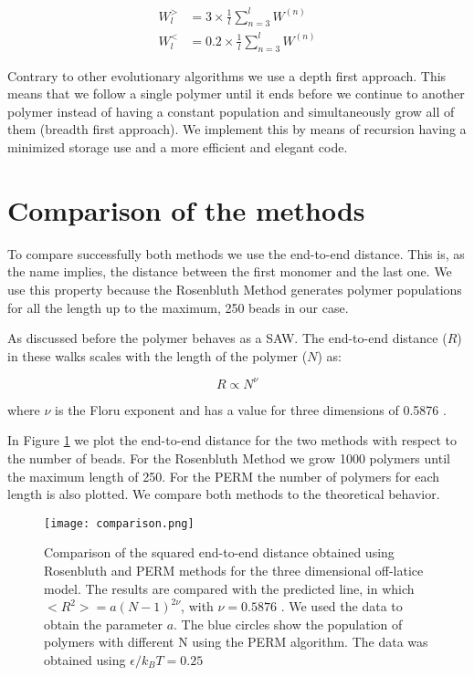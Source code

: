 \documentclass[aps,prl,reprint,groupedaddress]{revtex4-1}
\begin{document}
\begin{equation}
\begin{split}
	W_l^> &= 3 \times \frac{1}{l}\sum_{n=3}^l W^{(n)} \\
    W_l^< &= 0.2 \times \frac{1}{l}\sum_{n=3}^l W^{(n)}
\end{split}
\end{equation}

Contrary to other evolutionary algorithms we use a depth first approach. This means that we follow a single polymer until it ends before we continue to another polymer instead of having a constant population and simultaneously grow all of them (breadth first approach). We implement this by means of recursion having a minimized storage use and a more efficient and elegant code.\cite{grassberger} 

\section{Comparison of the methods}

To compare successfully both methods we use the end-to-end distance. This is, as the name implies, the distance between the first monomer and the last one. We use this property because the Rosenbluth Method generates polymer populations for all the length up to the maximum, 250 beads in our case. 

As discussed before the polymer behaves as a SAW. The end-to-end distance ($R$) in these walks scales with the length of the polymer ($N$) as:

\begin{equation}
	R \propto N^\nu
\end{equation}


where $\nu$ is the Floru exponent and has a value for three dimensions of 0.5876 \cite{Clisby2010}.

In Figure \ref{comparison} we plot the end-to-end distance for the two methods with respect to the number of beads. For the Rosenbluth Method we grow 1000 polymers until the maximum length of 250. For the PERM the number of polymers for each length is also plotted. We compare both methods to the theoretical behavior. 

\begin{figure}[ht]
	\texttt{[image: comparison.png]}
	\caption{Comparison of the squared end-to-end distance obtained using Rosenbluth and PERM methods for the three dimensional off-latice model. The results are compared with the predicted line, in which $<R^2> = a(N-1)^{2 \nu}$, with $\nu = 0.5876$ \cite{Clisby2010}. We used the data to obtain the parameter $a$. The blue circles show the population of polymers with different N using the PERM algorithm. The data was obtained using $\epsilon/k_B T = 0.25$\label{comparison}}
\end{figure}
\end{document}
